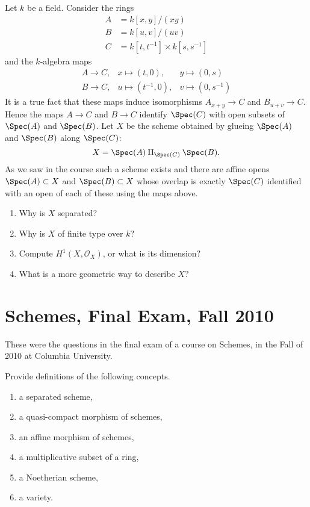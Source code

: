 \begin{exercise}
\label{exercise-glueing}
Let $k$ be a field.
Consider the rings
\begin{align*}
A & = k[x, y]/(xy) \\
B & = k[u, v]/(uv) \\
C & = k[t, t^{-1}] \times k[s, s^{-1}]
\end{align*}
and the $k$-algebra maps
$$
\begin{matrix}
A \longrightarrow C, &
x \mapsto (t, 0), &
y \mapsto (0, s) \\
B \longrightarrow C, &
u \mapsto (t^{-1}, 0), &
v \mapsto (0, s^{-1})
\end{matrix}
$$
It is a true fact that these maps induce isomorphisms
$A_{x + y} \to C$ and $B_{u + v} \to C$. Hence the maps $A \to C$
and $B \to C$ identify $\Spec(C)$ with open subsets of
$\Spec(A)$ and $\Spec(B)$. Let $X$ be the scheme obtained
by glueing $\Spec(A)$ and $\Spec(B)$ along $\Spec(C)$:
$$
X = \Spec(A) \amalg_{\Spec(C)} \Spec(B).
$$
As we saw in the course such a scheme exists and there are affine
opens $\Spec(A) \subset X$ and $\Spec(B) \subset X$
whose overlap is exactly $\Spec(C)$ identified with an open of
each of these using the maps above.
\begin{enumerate}
\item Why is $X$ separated?
\item Why is $X$ of finite type over $k$?
\item Compute $H^1(X, \mathcal{O}_X)$, or what is its dimension?
\item What is a more geometric way to describe $X$?
\end{enumerate}
\end{exercise}





\section{Schemes, Final Exam, Fall 2010}
\label{section-final-exam-fall-2010}

\noindent
These were the questions in the final exam of a course on Schemes,
in the Fall of 2010 at Columbia University.

\begin{exercise}[Definitions]
\label{exercise-definitions-fall-2010}
Provide definitions of the following concepts.
\begin{enumerate}
\item a separated scheme,
\item a quasi-compact morphism of schemes,
\item an affine morphism of schemes,
\item a multiplicative subset of a ring,
\item a Noetherian scheme,
\item a variety.
\end{enumerate}
\end{exercise}

